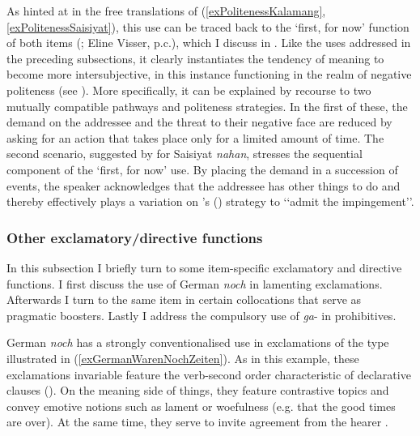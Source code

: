 As hinted at in the free translations of (\ref{exPolitenessKalamang}, \ref{exPolitenessSaisiyat}), this use can be traced back to the \lq first, for now\rq{ }function of both items (\cite[119–120]{Huang2008}; Eline Visser, p.c.), which I discuss in . Like the uses addressed in the preceding subsections, it clearly instantiates the tendency of meaning to become more intersubjective, in this instance functioning in the realm of negative politeness (see \cite{BrownLevinson1987}). More specifically, it can be explained by recourse to two mutually compatible pathways and politeness strategies. In the first of these, the demand on the addressee and the threat to their negative face are reduced by asking for an action that takes place only for a limited amount of time. The second scenario, suggested by \textcite[119–120]{Huang2008} for Saisiyat \textit{nahan}, stresses the sequential component of the \lq first, for now\rq{ }use. By placing the demand in a succession of events, the speaker acknowledges that the addressee has other things to do and thereby effectively plays a variation on \citeauthor{BrownLevinson1987}'s (\citeyear{BrownLevinson1987}) strategy to \lq\lq admit the impingement\rq\rq{}.
\pagebreak

\subsubsection{Other exclamatory/directive functions}\label{sectionExclamativeOther}
In this subsection I briefly turn to some item-specific exclamatory and directive functions. I first discuss the use of German \textit{noch} in lamenting exclamations. Afterwards I turn to the same item in certain collocations that serve as pragmatic boosters. Lastly I address the compulsory use of  \mbox{\textit{ga}-} in prohibitives.

German \textit{noch} has a strongly conventionalised use in exclamations of the type illustrated in (\ref{exGermanWarenNochZeiten}). As in this example, these exclamations invariable feature the verb-second order characteristic of declarative clauses (). On the meaning side of things, they feature contrastive topics and convey emotive notions such as lament or woefulness (e.g. that the good times are over). At the same time, they serve to invite agreement from the hearer \parencite[s.v. \textit{noch}]{Duden}.

